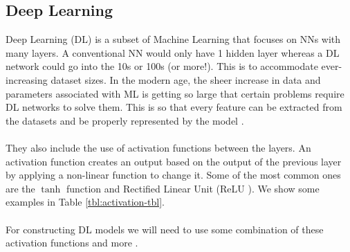 \subsection{Deep Learning}
Deep Learning (DL) is a subset of Machine Learning that focuses on NNs with many layers. 
A conventional NN would only have 1 hidden layer whereas a DL network could go into the 10s or 100s (or more!). 
This is to accommodate ever-increasing dataset sizes. 
In the modern age, the sheer increase in data and parameters associated with ML is getting so large that certain problems require DL networks to solve them. 
This is so that every feature can be extracted from the datasets and be properly represented by the model \cite{deeplearningbook}.
\\ \\
They also include the use of activation functions between the layers. 
An activation function creates an output based on the output of the previous layer by applying a non-linear function to change it. 
Some of the most common ones are the $\tanh$ function and Rectified Linear Unit (ReLU \cite{relu}). 
We show some examples in Table \ref{tbl:activation-tbl}. 
\\ \\
For constructing DL models we will need to use some combination of these activation functions and more \cite{wiki:activation}.

\newcommand{\tanhFunc}{
    $\tanh(x) = \dfrac{e^x - e^{-x}}{e^x + e^{-x}}$
}
\newcommand{\ReluFunc}{
    $ReLU(x) =
    \begin{cases}
      0 \hspace{0.5cm} $if $ x \leq 0\\    
      x \hspace{0.5cm} $if $ x > 0
    \end{cases}
    $
}
\newcommand{\SigmoidFunc}{
    $\sigma(x) = \dfrac{1}{1 + e^{-x}}$
}

\newcommand{\tanhDerivative}{
    $1 - \tanh(x)^2$
}
\newcommand{\ReluDerivative}{
    $
    \begin{cases}
      0 \hspace{0.5cm} $if $ x < 0\\
      1 \hspace{0.5cm} $if $ x > 0\\
      undefined \hspace{0.5cm} $if $ x == 0
    \end{cases}
    $
}
\newcommand{\SigmoidDerivative}{
    $\sigma(x)(1 - \sigma(x))$
}

